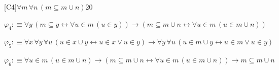 \begin{fullproof}{[C4]}{$\forall m\,\forall n\,(m \subseteq m \cup n)$}{20}
\begin{abbrevlist}
\item $\varphi_{4} :\equiv \forall y\,(m \subseteq y \leftrightarrow \forall u \in m\,(u \in y)) \to (m \subseteq m \cup n \leftrightarrow \forall u \in m\,(u \in m \cup n))$
\item $\varphi_{5} :\equiv \forall x\,\forall y\,\forall u\,(u \in x \cup y \leftrightarrow u \in x \lor u \in y) \to \forall y\,\forall u\,(u \in m \cup y \leftrightarrow u \in m \lor u \in y)$
\item $\varphi_{6} :\equiv \forall u \in m\,(u \in m \cup n) \to (m \subseteq m \cup n \leftrightarrow \forall u \in m\,(u \in m \cup n)) \to m \subseteq m \cup n$
\end{abbrevlist}
\end{fullproof}
